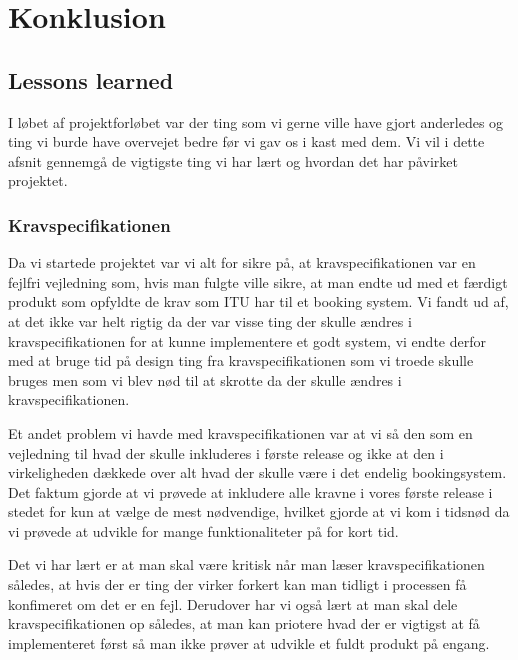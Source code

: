 \chapter{Konklusion}
\label{Konklusion}
\section{Lessons learned}
\label{Konklusion_Lessons}
I løbet af projektforløbet var der ting som vi gerne ville have gjort anderledes og ting vi burde have overvejet bedre før vi gav os i kast med dem. Vi vil i dette afsnit gennemgå de vigtigste ting vi har lært og hvordan det har påvirket projektet.

\subsection{Kravspecifikationen}
\label{Konklusion_Lessons_Krav}
Da vi startede projektet var vi alt for sikre på, at kravspecifikationen var en fejlfri vejledning som, hvis man fulgte ville sikre, at man endte ud med et færdigt produkt som opfyldte de krav som ITU har til et booking system. Vi fandt ud af, at det ikke var helt rigtig da der var visse ting der skulle ændres i kravspecifikationen for at kunne implementere et godt system, vi endte derfor med at bruge tid på design ting fra kravspecifikationen som vi troede skulle bruges men som vi blev nød til at skrotte da der skulle ændres i kravspecifikationen.

Et andet problem vi havde med kravspecifikationen var at vi så den som en vejledning til hvad der skulle inkluderes i første release og ikke at den i virkeligheden dækkede over alt hvad der skulle være i det endelig bookingsystem. Det faktum gjorde at vi prøvede at inkludere alle kravne i vores første release i stedet for kun at vælge de mest nødvendige, hvilket gjorde at vi kom i tidsnød da vi prøvede at udvikle for mange funktionaliteter på for kort tid.

Det vi har lært er at man skal være kritisk når man  læser kravspecifikationen således, at hvis der er ting der virker forkert kan man tidligt i processen få konfimeret om det er en fejl. Derudover har vi også lært at man skal dele kravspecifikationen op således, at man kan priotere hvad der er vigtigst at få implementeret først så man ikke prøver at udvikle et fuldt produkt på engang.


